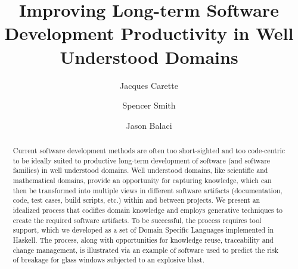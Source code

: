 \documentclass[sigconf,review]{acmart}
\begin{document}

\title{Improving Long-term Software Development Productivity in Well Understood Domains}

\author{Jacques Carette}

\author{Spencer Smith}

\author{Jason Balaci}

\begin{abstract}
  Current software development methods are often too short-sighted and too
  code-centric to be ideally suited to productive long-term development of
  software (and software families) in well understood domains.  Well understood
  domains, like scientific and mathematical domains, provide an opportunity for
  capturing knowledge, which can then be transformed into multiple views in
  different software artifacts (documentation, code, test cases, build scripts,
  etc.) within and between projects.  %
  We present an idealized process that codifies domain knowledge and employs
  generative techniques to create the required software artifacts.  To be
  successful, the process requires tool support, which we developed as a set of
  Domain Specific Languages implemented in Haskell.  The process, along with
  opportunities for knowledge reuse, traceability and change management, is
  illustrated via an example of software used to predict the risk of breakage
  for glass windows subjected to an explosive blast.
\end{abstract}
\end{document}
